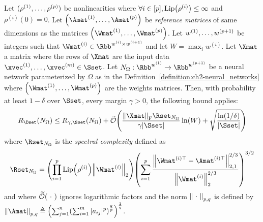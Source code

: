 \begin{theorem}
  Let $(\rho^{(1)}, \dots, \rho^{(p)})$ be nonlinearities where $\forall i \in [\depth], \lip{\rho^{(i)}} \leq \infty$ and $\rho^{(i)}(0) = 0$.
  Let $\left( \Amat^{(1)}, \dots, \Amat^{(\depth)} \right)$ be \emph{reference matrices} of same dimensions as the matrices $\left( \Wmat^{(1)}, \dots, \Wmat^{(\depth)} \right)$.
  Let $w^{(1)}, \dots, w^{(p+1)}$ be integers such that $\Wmat^{(i)} \in \Rbb^{\dimw^{(i)} \times \dimw^{(i+1)}}$ and let $W = \max_i w^{(i)}$.
  Let $\Xmat$ a matrix where the rows of $\Xmat$ are the input data $\xvec^{(1)}, \dots, \xvec^{(m)} \in \Sset$.
  Let $N_\Omega: \Rbb^{w^{(1)}} \rightarrow \Rbb^{w^{(\depth+1)}}$ be a neural network parameterized by $\Omega$ as in the Definition~\ref{definition:ch2-neural_networks} where $\left( \Wmat^{(1)}, \dots, \Wmat^{(\depth)} \right)$ are the weights matrices.
  Then, with probability at least $1 - \delta$ over $\Sset$, every margin $\gamma > 0$, the following bound applies:
  \begin{equation}
    R_\Dset(N_\Omega) \leq R_{\gamma,\Sset} (N_\Omega) + \widetilde{\bigO}\left( \frac{\norm{\Xmat}_\fro \Rset_{N_\Omega}}{\gamma |\Sset|} \ln(W) + \sqrt{\frac{\ln(1/\delta)}{|\Sset|}} \right)
  \end{equation}
  where $\Rset_{N_\Omega}$ is the \emph{spectral complexity} defined as 
  \begin{equation}
    \Rset_{N_\Omega} = \left(\prod_{i = 1}^{\depth} \lip{\rho^{(i)}} \norm{\Wmat^{(i)}}_2 \right) \left( \sum_{i=1}^{\depth} \frac{\norm{\Wmat^{(i)\top} - \Amat^{(i)\top}}_{2,1}^{2/3}}{\norm{\Wmat^{(i)}}_2^{2/3}} \right)^{3/2}
  \end{equation}
  and where $\widetilde{\mathcal{O}}(\ \cdot\ )$ ignores logarithmic factors and the norm $\norm{\ \cdot\ }_{p,q}$ is defined by $\norm{\Amat}_{p,q} \triangleq \left( \sum _{j=1}^{n} \left(\sum _{i=1}^{m} |a_{ij}|^{p} \right)^{\frac {q}{p}}\right)^{\frac {1}{q}}$.
\end{theorem}

